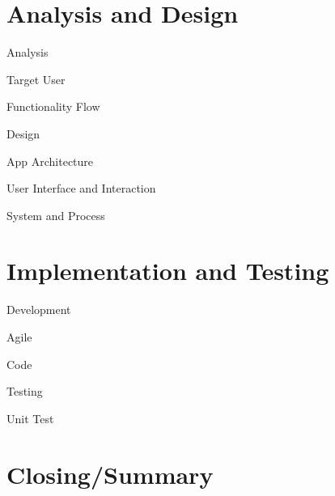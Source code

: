 \documentclass[10pt, compress]{beamer}
\begin{document}

\section{Analysis and Design}


\begin{frame}{Analysis}
  
  Target User
  
  Functionality Flow

\end{frame}


\begin{frame}{Design}
  
  App Architecture
  
  User Interface and Interaction
  
  System and Process

\end{frame}


\section{Implementation and Testing}


\begin{frame}{Development}

  Agile
  
  Code

\end{frame}


\begin{frame}{Testing}

  Unit Test

\end{frame}


\section{Closing/Summary}
\end{document}
